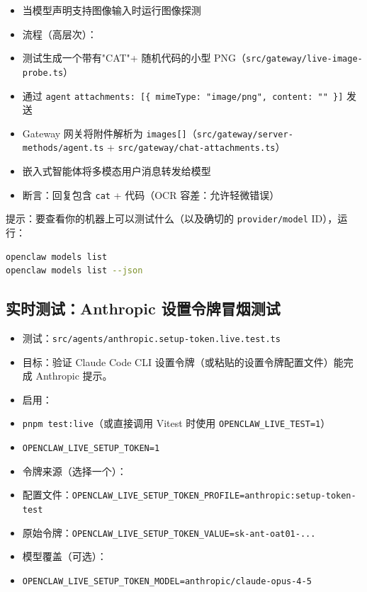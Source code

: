 \begin{itemize}
  \item 当模型声明支持图像输入时运行图像探测
  \item 流程（高层次）：
  \item 测试生成一个带有"CAT"+ 随机代码的小型 PNG（\texttt{src/gateway/live-image-probe.ts}）
  \item 通过 \texttt{agent} \texttt{attachments: [\{ mimeType: "image/png", content: "" \}]} 发送
  \item Gateway 网关将附件解析为 \texttt{images[]}（\texttt{src/gateway/server-methods/agent.ts} + \texttt{src/gateway/chat-attachments.ts}）
  \item 嵌入式智能体将多模态用户消息转发给模型
  \item 断言：回复包含 \texttt{cat} + 代码（OCR 容差：允许轻微错误）
\end{itemize}


提示：要查看你的机器上可以测试什么（以及确切的 \texttt{provider/model} ID），运行：

\begin{lstlisting}[language=bash]
openclaw models list
openclaw models list --json
\end{lstlisting}


\subsection{实时测试：Anthropic 设置令牌冒烟测试}


\begin{itemize}
  \item 测试：\texttt{src/agents/anthropic.setup-token.live.test.ts}
  \item 目标：验证 Claude Code CLI 设置令牌（或粘贴的设置令牌配置文件）能完成 Anthropic 提示。
  \item 启用：
  \item \texttt{pnpm test:live}（或直接调用 Vitest 时使用 \texttt{OPENCLAW\_LIVE\_TEST=1}）
  \item \texttt{OPENCLAW\_LIVE\_SETUP\_TOKEN=1}
  \item 令牌来源（选择一个）：
  \item 配置文件：\texttt{OPENCLAW\_LIVE\_SETUP\_TOKEN\_PROFILE=anthropic:setup-token-test}
  \item 原始令牌：\texttt{OPENCLAW\_LIVE\_SETUP\_TOKEN\_VALUE=sk-ant-oat01-...}
  \item 模型覆盖（可选）：
  \item \texttt{OPENCLAW\_LIVE\_SETUP\_TOKEN\_MODEL=anthropic/claude-opus-4-5}
\end{itemize}


